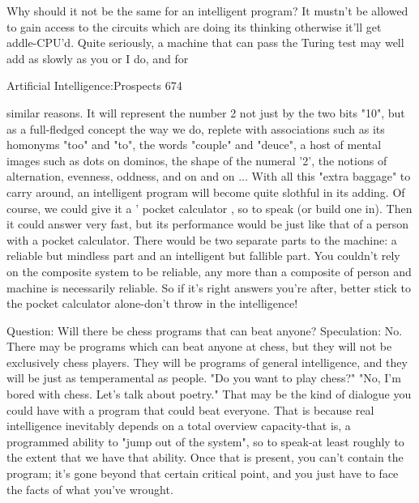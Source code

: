    Why should it not be the same for an intelligent program? It mustn't be allowed to gain
    access to the circuits which are doing its thinking otherwise it'll get addle-CPU'd.
    Quite seriously, a machine that can pass the Turing test may well add as slowly as
    you or I do, and for




Artificial Intelligence:Prospects                                                     674

   similar reasons. It will represent the number 2 not just by the two bits "10", but as a
      full-fledged concept the way we do, replete with associations such as its homonyms
      "too" and "to", the words "couple" and "deuce", a host of mental images such as
      dots on dominos, the shape of the numeral '2', the notions of alternation, evenness,
      oddness, and on and on ... With all this "extra baggage" to carry around, an
      intelligent program will become quite slothful in its adding. Of course, we could
      give it a ' pocket calculator , so to speak (or build one in). Then it could answer
      very fast, but its performance would be just like that of a person with a pocket
      calculator. There would be two separate parts to the machine: a reliable but
      mindless part and an intelligent but fallible part. You couldn't rely on the composite
      system to be reliable, any more than a composite of person and machine is
      necessarily reliable. So if it's right answers you're after, better stick to the pocket
      calculator alone-don't throw in the intelligence!

Question: Will there be chess programs that can beat anyone?
  Speculation: No. There may be programs which can beat anyone at chess, but they
     will not be exclusively chess players. They will be programs of general
     intelligence, and they will be just as temperamental as people. "Do you want to play
     chess?" "No, I'm bored with chess. Let's talk about poetry." That may be the kind of
     dialogue you could have with a program that could beat everyone. That is because
     real intelligence inevitably depends on a total overview capacity-that is, a
     programmed ability to "jump out of the system", so to speak-at least roughly to the
     extent that we have that ability. Once that is present, you can't contain the program;
     it's gone beyond that certain critical point, and you just have to face the facts of
     what you've wrought.

